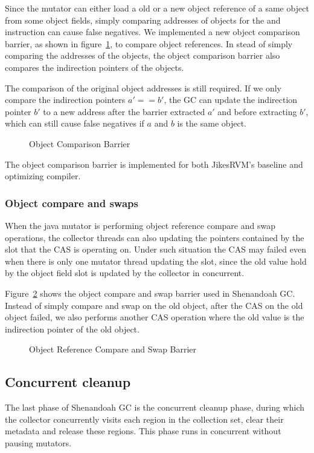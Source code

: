 Since the mutator can either load a old or a new object reference of a same object
from some object fields, simply comparing addresses of objects for the  and 
instruction can cause false negatives. We implemented a new object comparison barrier,
as shown in figure~\ref{fig:objectcomparisonbarrier}, to compare object references.
In stead of simply comparing the addresses of the objects, the object comparison barrier also
compares the indirection pointers of the objects.

The comparison of the original object addresses is still required. If we only compare the
indirection pointers $a' == b'$, the GC can update the indirection pointer $b'$ to a new
address after the barrier extracted $a'$ and before extracting $b'$, which can still cause false
negatives if $a$ and $b$ is the same object.

\begin{figure}
  \centering
  
  \caption{Object Comparison Barrier}
  \label{fig:objectcomparisonbarrier}
\end{figure}

The object comparison barrier is implemented for both JikesRVM's baseline and optimizing compiler.

\subsubsection{Object compare and swaps}

When the java mutator is performing object reference compare and swap operations,
the collector threads can also updating the pointers contained by the slot that the CAS
is operating on. Under such situation the CAS may failed even when there is only one mutator
thread updating the slot, since the old value hold by the object field slot is updated
by the collector in concurrent.

Figure~\ref{fig:objectcasbarrier} shows the object compare and swap barrier used in Shenandoah GC.
Instead of simply compare and swap on the old object, after the CAS on the old object failed,
we also performs another CAS operation where the old value is the indirection pointer of the old object.

\begin{figure}
  \centering
  
  \caption{Object Reference Compare and Swap Barrier} 
  \label{fig:objectcasbarrier}
\end{figure}

\subsection{Concurrent cleanup}

The last phase of Shenandoah GC is the concurrent cleanup phase, during which the
collector concurrently visits each region in the collection set, clear their metadata
and release these regions. This phase runs in concurrent without pausing mutators.


